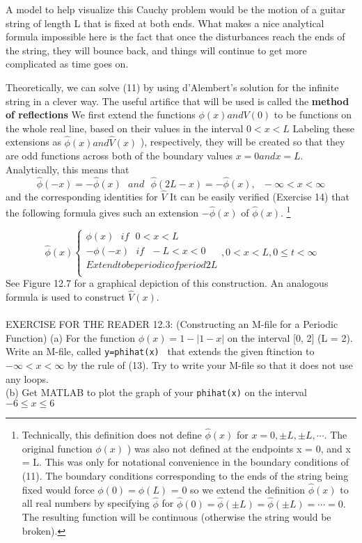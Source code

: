 \documentclass[../main.tex]{subfiles}
\begin{document}
A model to help visualize this Cauchy problem would be the motion of a guitar
string of length L that is fixed at both ends. What makes a nice analytical formula
impossible here is the fact that once the disturbances reach the ends of the string,
they will bounce back, and things will continue to get more complicated as time
goes on.

Theoretically, we can solve (11) by using d'Alembert's solution for the infinite
string in a clever way. The useful artifice that will be used is called the \textbf{method of
reflections} We first extend the functions $\phi(x) and V(0)$  to be functions on the
whole real line, based on their values in the interval $ 0< x < L$  Labeling these
extensions as $\hat{\phi}(x) and \hat{V}(x)$ ), respectively, they will be created so that they are
odd functions across both of the boundary values $x = 0 and x = L$. Analytically,
this means that
\newpage
\begin{equation}
\hat{\phi}(-x)= -\hat{\phi}(x) ~~~and~~~ \hat{\phi}(2L - x) = -\hat{\phi}(x),~~~ -\infty < x<\infty
\end{equation}
and the corresponding identities for $\hat{V}$ It can be easily verified (Exercise 14)
that the following formula gives such an extension $-\hat{\phi}(x)$ of $\hat{\phi}(x)$.
\footnote{ Technically, this definition does not define
$\hat{\phi}(x)$ for $x=0, \pm L, \pm L, \cdots .$ The original function $\phi(x)$ ) was also not defined at the endpoints x = 0, and x = L. This was only for notational convenience
in the boundary conditions of (11). The boundary conditions corresponding to the ends of the string
being fixed would force   $\phi(0) = \phi(L)$ = 0 so we extend the definition $\hat{\phi}(x)$ to all real numbers by
specifying $\hat{\phi}$ for $\hat{\phi}(0)=\hat{\phi} (\pm L) =\hat{\phi}(\pm L) = \cdots =0.$  The resulting function will be continuous (otherwise the
string would be broken). }

\begin{equation}
\hat{\phi}(x)
	\begin{cases} 
\phi (x)   ~~~ if~~~ 0< x< L\\
-\phi (-x) ~~~ if ~~~ -L < x <0\\
Extend to be periodic of period 2L\\
\end{cases}		
,0 < x < L, 0\leqslant t  < \infty	
\end{equation}
See Figure 12.7 for a graphical depiction of this construction. An analogous
formula is used to construct $\hat{V}(x)$.\\
\\
EXERCISE FOR THE READER 12.3: (Constructing an M-file for a Periodic
Function) (a) For the function $\phi(x) = 1-|1-x|$ on the interval [0, 2] (L = 2).
Write an M-file, called \texttt{y=phihat(x) } that extends the given ftinction to $-\infty < x<\infty$  by the rule of (13). Try to write your M-file so that it does not use
any loops.
\\
(b) Get MATLAB to plot the graph of your \texttt{phihat(x)} on the interval  $-6\leqslant x \leqslant 6$\\
\end{document}
